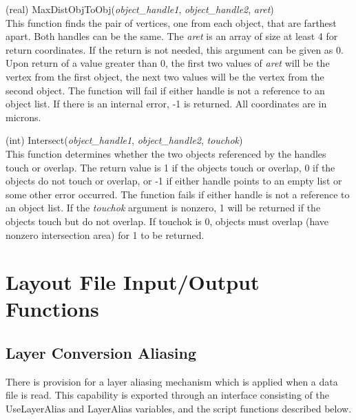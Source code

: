 \begin{description}
\item{(real) \vt MaxDistObjToObj({\it object\_handle1\/},
 {\it object\_handle2\/}, {\it aret\/})}\\
This function finds the pair of vertices, one from each object, that
are farthest apart.  Both handles can be the same.  The {\it aret} is
an array of size at least 4 for return coordinates.  If the return is
not needed, this argument can be given as 0.  Upon return of a value
greater than 0, the first two values of {\it aret} will be the vertex
from the first object, the next two values will be the vertex from the
second object.  The function will fail if either handle is not a
reference to an object list.  If there is an internal error, -1 is
returned.  All coordinates are in microns.

\item{(int) \vt Intersect({\it object\_handle1\/},
 {\it object\_handle2\/}, {\it touchok\/})}\\
This function determines whether the two objects referenced by the
handles touch or overlap.  The return value is 1 if the objects touch
or overlap, 0 if the objects do not touch or overlap, or -1 if either
handle points to an empty list or some other error occurred.  The
function fails if either handle is not a reference to an object list. 
If the {\it touchok} argument is nonzero, 1 will be returned if the
objects touch but do not overlap.  If touchok is 0, objects must
overlap (have nonzero intersection area) for 1 to be returned.

\end{description}


\section{Layout File Input/Output Functions}
\subsection{Layer Conversion Aliasing}

There is provision for a layer aliasing mechanism which is applied
when a data file is read.  This capability is exported through an
interface consisting of the {\et UseLayerAlias} and {\et LayerAlias}
variables, and the script functions described below.

